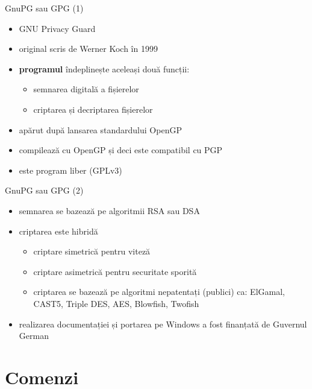 \documentclass{beamer}
\begin{document}
\begin{frame}{GnuPG sau GPG (1)}
  \begin{itemize}
    \item GNU Privacy Guard
    \item original scris de Werner Koch în 1999
    \item \textbf{programul} îndeplinește aceleași două funcții:
    \begin{itemize}
      \item semnarea digitală a fișierelor
      \item criptarea și decriptarea fișierelor
    \end{itemize}
    \item apărut după lansarea standardului OpenGP
    \item compilează cu OpenGP și deci este compatibil cu PGP
    \item este program liber (GPLv3)
  \end{itemize}
\end{frame}

\begin{frame}{GnuPG sau GPG (2)}
  \begin{itemize}
    \item semnarea se bazează pe algoritmii RSA sau DSA
    \item criptarea este hibridă
    \begin{itemize}
      \item criptare simetrică pentru viteză
      \item criptare asimetrică pentru securitate sporită
      \item criptarea se bazează pe algoritmi nepatentați (publici) ca:
      ElGamal, CAST5, Triple DES, AES, Blowfish, Twofish
    \end{itemize}
    \item realizarea documentației și portarea pe Windows a fost finanțată de 
    Guvernul German
  \end{itemize}
\end{frame}

\section{Comenzi}
\frame{\tableofcontents[currentsection]}
\end{document}

